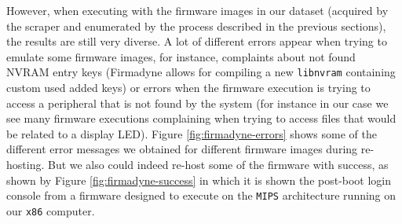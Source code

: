However, when executing with the firmware images in our dataset (acquired by the scraper and enumerated by the process described in the previous sections), the results are still very diverse. A lot of different errors appear when trying to emulate some firmware images, for instance, complaints about not found NVRAM entry keys (Firmadyne allows for compiling a new {\tt libnvram} containing custom used added keys) or errors when the firmware execution is trying to access a peripheral that is not found by the system (for instance in our case we see many firmware executions complaining when trying to access files that would be related to a display LED). Figure \ref{fig:firmadyne-errors} shows some of the different error messages we obtained for different firmware images during re-hosting. But we also could indeed re-host some of the firmware with success, as shown by Figure \ref{fig:firmadyne-success} in which it is shown the post-boot login console from a firmware designed to execute on the {\tt MIPS} architecture running on our {\tt x86} computer.

